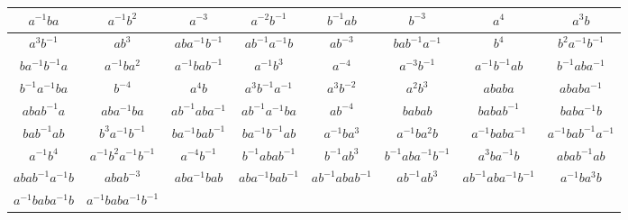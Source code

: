 \documentclass[11pt]{amsart}
\theoremstyle{mythm}
\theoremstyle{mydef}
\theoremstyle{myrem}
\numberwithin{equation}{section}
\begin{document}
\begin{table}[ht]
{\begin{center}
\begin{tabular}{|c|c|c|c|c|c|c|c|}
 			\hline
 			$a^{-1}ba$ & $a^{-1}b^{2}$ & $a^{-3}$ & $a^{-2}b^{-1}$ & $b^{-1}ab$ & $b^{-3}$ & $a^{4}$ & $a^{3}b$ \\
 			\hline
 			$a^{3}b^{-1}$ & $ab^{3}$ & $aba^{-1}b^{-1}$ & $ab^{-1}a^{-1}b$ & $ab^{-3}$ & $bab^{-1}a^{-1}$ & $b^{4}$ & $b^{2}a^{-1}b^{-1}$ \\
 			\hline
 			$ba^{-1}b^{-1}a$ & $a^{-1}ba^{2}$ & $a^{-1}bab^{-1}$ & $a^{-1}b^{3}$ & $a^{-4}$ & $a^{-3}b^{-1}$ & $a^{-1}b^{-1}ab$ & $b^{-1}aba^{-1}$ \\
 			\hline
 			$b^{-1}a^{-1}ba$ & $b^{-4}$ & $a^{4}b$ & $a^{3}b^{-1}a^{-1}$ & $a^{3}b^{-2}$ & $a^{2}b^{3}$ & $ababa$ & $ababa^{-1}$ \\
 			\hline
 			$abab^{-1}a$ & $aba^{-1}ba$ & $ab^{-1}aba^{-1}$ & $ab^{-1}a^{-1}ba$ & $ab^{-4}$ & $babab$ & $babab^{-1}$ & $baba^{-1}b$ \\
 			\hline
 			$bab^{-1}ab$ & $b^{3}a^{-1}b^{-1}$ & $ba^{-1}bab^{-1}$ & $ba^{-1}b^{-1}ab$ & $a^{-1}ba^{3}$ & $a^{-1}ba^{2}b$ & $a^{-1}baba^{-1}$ & $a^{-1}bab^{-1}a^{-1}$ \\
 			\hline
 			$a^{-1}b^{4}$ & $a^{-1}b^{2}a^{-1}b^{-1}$ & $a^{-4}b^{-1}$ & $b^{-1}abab^{-1}$ & $b^{-1}ab^{3}$ & $b^{-1}aba^{-1}b^{-1}$ & $a^{3}ba^{-1}b$ & $abab^{-1}ab$ \\
 			\hline
 			$abab^{-1}a^{-1}b$ & $abab^{-3}$ & $aba^{-1}bab$ & $aba^{-1}bab^{-1}$ & $ab^{-1}abab^{-1}$ & $ab^{-1}ab^{3}$ & $ab^{-1}aba^{-1}b^{-1}$ & $a^{-1}ba^{3}b$ \\
 			\hline
 			$a^{-1}baba^{-1}b$ & $a^{-1}baba^{-1}b^{-1}$ \\
 			\hline
 			\end{tabular}
 		\end{center}  
 	}
 \end{table}   
\end{document}
